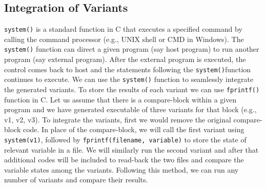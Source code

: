 \documentclass[conference]{IEEEtran}
\begin{document}
\subsection{Integration of Variants}
\label{integration}
\texttt{system()} is a standard function  in C that executes a specified command by calling the command processor (e.g., UNIX shell or CMD in Windows). The \texttt{system()} function can direct a given program (say host program) to run another program (say external program). After the external program is executed, the control comes back to host and the statements following the \texttt{system()}function continues to execute. We can use the \texttt{system()} function to seamlessly integrate the generated variants. To store the results of each variant we can use \texttt{fprintf()} function in C. Let us assume that there is a compare-block within a given program and we have generated executable of three variants for that block (e.g., v1, v2, v3). To integrate the variants, first we would remove the original compare-block code. In place of the compare-block, we will call the first variant using \texttt{system(v1)}, followed by \texttt{fprintf(filename, variable)} to store the state of relevant variable in a file. We will similarly run the second variant and after that additional codes will be included to read-back the two files and compare the variable states among the variants. Following this method, we can run any number of variants and compare their results. 
\end{document}
